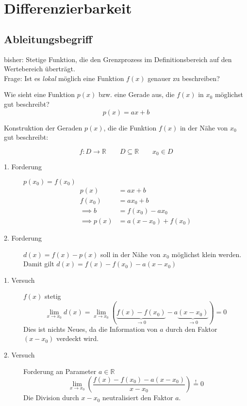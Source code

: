 \section{Differenzierbarkeit}
\subsection{Ableitungsbegriff}

bisher: Stetige Funktion, die den Grenzprozess im Definitionsbereich auf den Wertebereich überträgt.\\
Frage: Ist es \emph{lokal} möglich eine Funktion \( f(x) \) genauer zu beschreiben? 

Wie sieht eine Funktion \( p(x) \) bzw. eine Gerade aus, die \( f(x) \) in \( x_0 \) möglichst gut beschreibt?
\[
p(x)=ax+b 
\]
\begin{center}
  \centering
{}
  \label{fig:Approximierung}
\end{center}

\noindent Konstruktion der Geraden \( p(x) \), die die Funktion \( f(x) \) in der Nähe von \( x_0 \) gut beschreibt:

\[
	f:D\rightarrow\mathbb{R} \qquad D\subseteq\mathbb{R} \qquad x_0 \in D
\]

\begin{description}
	\item[1. Forderung] \( p(x_0)=f(x_0) \) 
	\begin{align*}
			p(x) &= ax+b \\
			f(x_0) &= ax_0+b \\
			\implies b &= f(x_0)-ax_0 \\
			\implies p(x) &= a(x-x_0)+f(x_0)
	\end{align*}
	\item[2. Forderung] \( d(x)=f(x)-p(x) \) soll in der Nähe von \( x_0 \) möglichst klein werden. Damit gilt \( d(x) = f(x) -f(x_0)-a(x-x_0) \)
	\item[1. Versuch] \( f(x) \) stetig  
	\[\lim_{x\rightarrow x_0} d(x)=\lim_{x\rightarrow x_0}(\underbrace{f(x)-f(x_0)}_{\rightarrow 0}-a\underbrace{(x-x_0)}_{\rightarrow 0})=0\]Dies ist nichts Neues, da die Information von \( a \) durch den Faktor \( (x-x_0) \) verdeckt wird.
	\item[2. Versuch] Forderung an Parameter \( a \in \mathbb{R} \)
	\[
		\lim_{x\rightarrow x_0}\left(\frac{f(x)-f(x_0)-a(x-x_0)}{x-x_0}\right)\stackrel{!}{=}0
	\]
	Die Division durch \( x-x_0 \) neutralisiert den Faktor \( a \).
\end{description}


